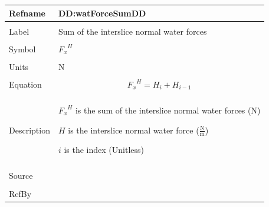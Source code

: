 \documentclass[12pt]{article}
\begin{document}
\noindent \begin{minipage}{\textwidth}
\begin{tabular}{p{} p{}}
\toprule \textbf{Refname} & \textbf{DD:watForceSumDD}
\label{DD:watForceSumDD}
\\ \midrule \\
Label & Sum of the interslice normal water forces
        \\ \midrule \\
        Symbol & ${{F_{x}}^{H}}$
                 \\ \midrule \\
                 Units & N
                         \\ \midrule \\
                         Equation & \begin{displaymath}
                                    {{F_{x}}^{H}}=H_{i}+H_{i-1}
                                    \end{displaymath}
                                    \\ \midrule \\
                                    Description & \begin{symbDescription}
                                                  \item{${{F_{x}}^{H}}$ is the sum of the interslice normal water forces (N)}
                                                  \item{$H$ is the interslice normal water force  ($\frac{\text{N}}{\text{m}}$)}
                                                  \item{$i$ is the index (Unitless)}
                                                  \end{symbDescription}
                                                  \\ \midrule \\
                                                  Source & \\ \midrule \\
                                                           RefBy & 
\\ \bottomrule \end{tabular}
\end{minipage}
\par~
\end{document}
